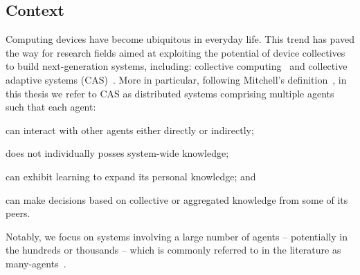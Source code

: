 \documentclass[12pt]{article}
\begin{document}
\subsection{Context}
Computing devices have become ubiquitous in everyday life.
%
This trend has paved the way for research fields aimed at exploiting
 the potential of device collectives to build next-generation systems, 
 including: collective computing~\cite{DBLP:journals/computer/Abowd16}
 and collective adaptive systems (CAS)~\cite{DBLP:journals/sttt/WirsingJN23,robyphdthesis}.
%
More in particular, following Mitchell's definition~\cite{DBLP:conf/metacognition/Mitchell05}, 
 in this thesis we refer to CAS as distributed systems comprising multiple agents 
 such that each agent:
 \begin{enumerate*}[label=(\roman*)]
	\item can interact with other agents either directly or indirectly;
	\item does not individually posses system-wide knowledge;
	\item can exhibit learning to expand its personal knowledge; and
	\item can make decisions based on collective or aggregated knowledge from some of its peers.
 \end{enumerate*}
%
Notably, we focus on systems involving a large number of agents -- potentially in the hundreds
 or thousands -- which is commonly referred to in the literature 
 as many-agents~\cite{DBLP:phd/ethos/Yang21a}.
\end{document}
